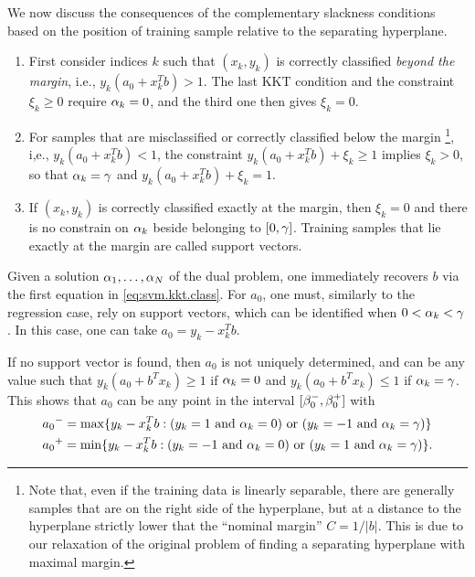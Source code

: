 \bigskip
We now discuss the consequences of the complementary slackness conditions based on the position of training sample relative to the separating hyperplane.
\begin{enumerate}[label=(\roman*),wide=0cm] 
\item First consider indices $k$ such that $(x_k, y_k)$ is correctly classified {\em beyond the margin}, i.e., $y_k({a_0} + x_k^T b ) > 1$.
The last KKT condition and the constraint $\xi_k \geq 0$ require $\alpha_k = 0$, and the third one then gives $\xi_k=0$.
\item For samples that are misclassified or correctly classified below the margin
\footnote{Note that, even if the training data is linearly separable, there are generally samples that are on the right side of the hyperplane, but at a distance to the hyperplane strictly lower that the ``nominal margin'' $C = 1/|b|$. This is due to our relaxation of the original problem of finding a separating hyperplane with maximal margin.}, i,e.,  $y_k({a_0} + x_k^T b ) < 1$, the constraint $y_k({a_0} + x_k^Tb) +\xi_k \geq 1$ implies $\xi_k >0$, so that $\alpha_k = \gamma$ and $y_k({a_0} + x_k^Tb) +\xi_k = 1$.
\item If $(x_k, y_k)$ is correctly classified exactly at the margin, then $\xi_k=0$ and there is no constrain on $\alpha_k$ beside belonging to $[0,\gamma]$. 
Training samples that lie exactly at the margin are called \alert{support vectors}.
\end{enumerate}

Given a solution $\alpha_1, \ldots, \alpha_N$ of the dual problem, one immediately recovers $b$ via the first equation in \cref{eq:svm.kkt.class}. For ${a_0}$, one must, similarly to the regression case, rely on support vectors, which can be identified when $0 < \alpha_k < \gamma$. In this case, one can take ${a_0} = y_k - x_k^T b$. 

If no support vector is found, then ${a_0}$ is not uniquely determined, and can be any value such that $y_k({a_0} + b^Tx_k) \geq 1$ if $\alpha_k=0$ and $y_k({a_0} + b^Tx_k) \leq 1$ if $\alpha_k = \gamma$.  This shows that ${a_0}$ can be any point in the interval  $[\beta^-_{0}, \beta^+_{0}]$ with
\begin{align*}
&{a_0}^- =
\max\{ y_k- x_k^Tb: (y_k=1 \text{ and } \alpha_k=0) \text{ or } (y_k=-1 \text{ and } \alpha_k=\gamma)\}  \\
&{a_0}^+ = \min\{ y_k- x_k^Tb: (y_k=-1 \text{ and } \alpha_k=0) \text{ or } (y_k=1 \text{ and } \alpha_k=\gamma)\}.
\end{align*}


